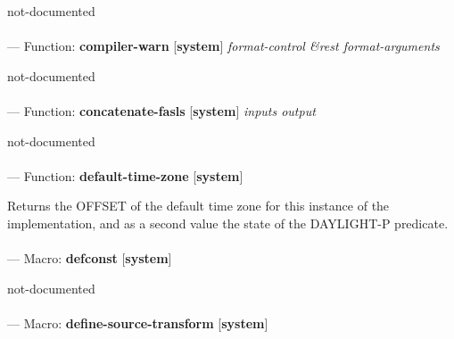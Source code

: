 \begin{adjustwidth}{5em}{5em}
not-documented
\end{adjustwidth}

\paragraph{}
\label{SYSTEM:COMPILER-WARN}
--- Function: \textbf{compiler-warn} [\textbf{system}] \textit{format-control \&rest format-arguments}

\begin{adjustwidth}{5em}{5em}
not-documented
\end{adjustwidth}

\paragraph{}
\label{SYSTEM:CONCATENATE-FASLS}
--- Function: \textbf{concatenate-fasls} [\textbf{system}] \textit{inputs output}

\begin{adjustwidth}{5em}{5em}
not-documented
\end{adjustwidth}

\paragraph{}
\label{SYSTEM:DEFAULT-TIME-ZONE}
--- Function: \textbf{default-time-zone} [\textbf{system}] \textit{}

\begin{adjustwidth}{5em}{5em}
Returns the OFFSET of the default time zone for this instance of the implementation, and as a second value the state of the DAYLIGHT-P predicate.
\end{adjustwidth}

\paragraph{}
\label{SYSTEM:DEFCONST}
--- Macro: \textbf{defconst} [\textbf{system}] \textit{}

\begin{adjustwidth}{5em}{5em}
not-documented
\end{adjustwidth}

\paragraph{}
\label{SYSTEM:DEFINE-SOURCE-TRANSFORM}
--- Macro: \textbf{define-source-transform} [\textbf{system}] \textit{}


